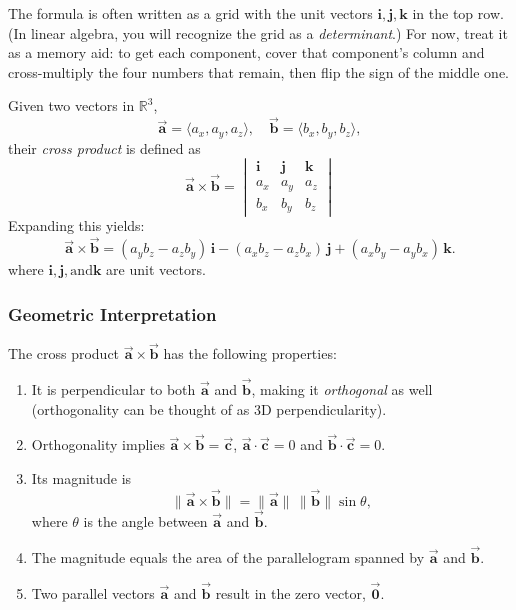 The formula is often written as a grid with the unit vectors
$\mathbf{i}, \mathbf{j}, \mathbf{k}$ in the top row. (In linear algebra,
you will recognize the grid as a \emph{determinant}.) For now, treat it as
a memory aid: to get each component, cover that component's column and
cross-multiply the four numbers that remain, then flip the sign of the
middle one.
\begin{mdframed}[style=important]
Given two vectors in $\mathbb{R}^3$,
\[
\vec{\mathbf{a}} = \langle a_x, a_y, a_z \rangle, \quad
\vec{\mathbf{b}} = \langle b_x, b_y, b_z \rangle,
\]
their \emph{cross product} is defined as
\[
\vec{\mathbf{a}} \times \vec{\mathbf{b}} =
\begin{vmatrix}
\mathbf{i} & \mathbf{j} & \mathbf{k} \\
a_x & a_y & a_z \\
b_x & b_y & b_z
\end{vmatrix}
\]
Expanding this yields:
\[
\vec{\mathbf{a}} \times \vec{\mathbf{b}} =
(a_y b_z - a_z b_y)\,\mathbf{i}
- (a_x b_z - a_z b_x)\,\mathbf{j}
+ (a_x b_y - a_y b_x)\,\mathbf{k}.
\]
where $\mathbf{i}, \mathbf{j}, \text{and} \mathbf{k}$ are unit vectors.
\end{mdframed}


\subsubsection{Geometric Interpretation}
The cross product $\vec{\mathbf{a}} \times \vec{\mathbf{b}}$ has the following properties:
\begin{enumerate}
    \item It is perpendicular to both $\vec{\mathbf{a}}$ and $\vec{\mathbf{b}}$, making it \emph{orthogonal} as well (orthogonality can be thought of as 3D perpendicularity).
    \item Orthogonality implies $\vec{\mathbf{a}} \times \vec{\mathbf{b}} = \vec{\mathbf{c}}$, $\vec{\mathbf{a}} \cdot \vec{\mathbf{c}} = 0$ and $\vec{\mathbf{b}} \cdot \vec{\mathbf{c}} = 0$. 
    \item {}Its magnitude is
    \[
    \|\vec{\mathbf{a}} \times \vec{\mathbf{b}}\| = \|\vec{\mathbf{a}}\|\,\|\vec{\mathbf{b}}\| \sin\theta,
    \]
    where $\theta$ is the angle between $\vec{\mathbf{a}}$ and $\vec{\mathbf{b}}$.
    \item The magnitude equals the area of the parallelogram spanned by $\vec{\mathbf{a}}$ and $\vec{\mathbf{b}}$.
    \item Two parallel vectors $\vec{\mathbf{a}}$ and $\vec{\mathbf{b}}$ result in the zero vector, $\vec{\mathbf{0}}$. 
\end{enumerate}


